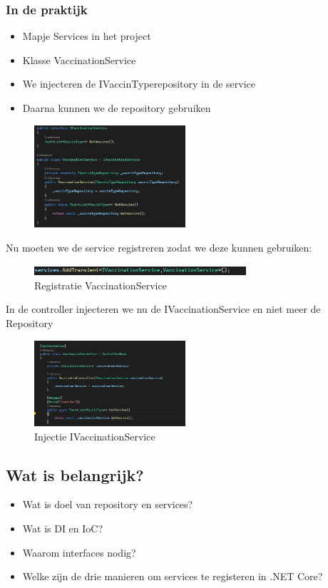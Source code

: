 \documentclass{article}
\begin{document}
\subsubsection{In de praktijk}

\begin{itemize}
    \item Mapje Services in het project
    \item Klasse VaccinationService
    \item We injecteren de IVaccinTyperepository in de service
    \item Daarna kunnen we de repository gebruiken
\end{itemize}

\begin{figure}[H]
    \centering
    \includegraphics[width=0.5\textwidth]{services-1.png}
    \caption{}
\end{figure}

Nu moeten we de service registreren zodat we deze kunnen gebruiken:

\begin{figure}[H]
    \centering
    \includegraphics[width=0.7\textwidth]{services-2.png}
    \caption{Registratie VaccinationService}
\end{figure}

In de controller injecteren we nu de IVaccinationService en niet meer de Repository

\begin{figure}[H]
    \centering
    \includegraphics[width=0.5\textwidth]{services-3.png}
    \caption{Injectie IVaccinationService}
\end{figure}

\subsection{Wat is belangrijk?}

\begin{itemize}
    \item Wat is doel van repository en services?
    \item Wat is DI en IoC?
    \item Waarom interfaces nodig?
    \item Welke zijn de drie manieren om services te registeren in .NET Core?
\end{itemize}
\end{document}
